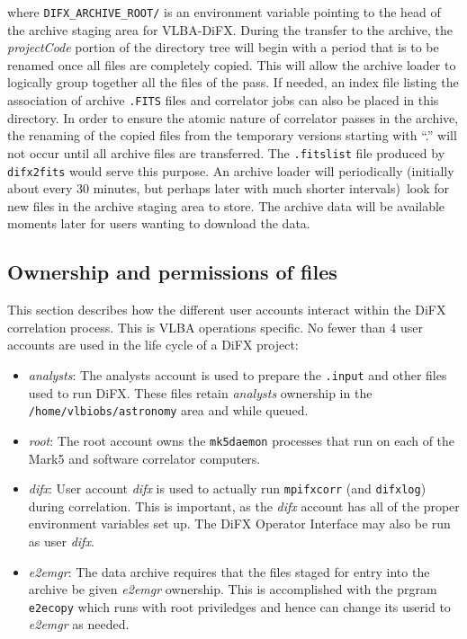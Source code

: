 \noindent
where {\tt DIFX\_ARCHIVE\_ROOT/} is an environment variable pointing to the head of the archive staging area for VLBA-DiFX.
During the transfer to the archive, the {\em projectCode} portion of the directory tree will begin with a period that is to be renamed once all files are completely copied.
This will allow the archive loader to logically group together all the files of the pass.
If needed, an index file listing the association of archive {\tt .FITS} files and correlator jobs can also be placed in this directory.
In order to ensure the atomic nature of correlator passes in the archive, the renaming of the copied files from the temporary versions starting with ``.'' will not occur until all archive files are transferred.
The {\tt .fitslist} file produced by {\tt difx2fits} would serve this purpose.
An archive loader will periodically (initially about every 30 minutes, but perhaps later with much shorter intervals)\ look for new files in the archive staging area to store.
The archive data will be available moments later for users wanting to download the data.

\subsection{Ownership and permissions of files} \label{sec:permissions}

This section describes how the different user accounts interact within the DiFX correlation process.
This is VLBA operations specific.
No fewer than 4 user accounts are used in the life cycle of a DiFX project:

\begin{itemize}

\item {\it analysts}: 
The analysts account is used to prepare the {\tt .input} and other files used to run DiFX.
These files retain {\em analysts} ownership in the {\tt /home/vlbiobs/astronomy} area and while queued.

\item {\it root}:
The root account owns the {\tt mk5daemon} processes that run on each of the Mark5 and software correlator computers.

\item {\it difx}:
User account {\it difx} is used to actually run {\tt mpifxcorr} (and {\tt difxlog}) during correlation.
This is important, as the {\it difx} account has all of the proper environment variables set up.
The DiFX Operator Interface may also be run as user {\it difx}.

\item {\it e2emgr}:
The data archive requires that the files staged for entry into the archive be given {\it e2emgr} ownership.
This is accomplished with the prgram {\tt e2ecopy} which runs with root priviledges and hence can change its userid to {\it e2emgr} as needed.

\end{itemize}


